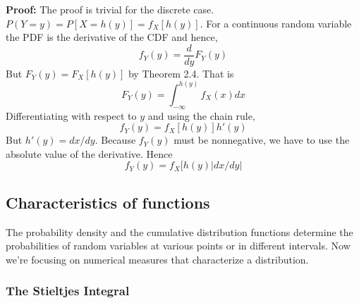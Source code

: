 \documentclass{article}
\begin{document}
\textbf{Proof:} The proof is trivial for the discrete case. \(P(Y=y) = P[X=h(y)] = f_X[h(y)]\). For a continuous random variable the PDF is the derivative of the CDF and hence,
\begin{equation*}
    f_Y(y)= \frac{d}{dy} F_Y(y)
\end{equation*}
But \(F_Y(y) = F_X[h(y)]\) by Theorem 2.4. That is
\begin{equation*}
    F_Y(y)= \int_{- \infty}^{h(y)} f_X(x) dx
\end{equation*}
Differentiating with respect to \(y\) and using the chain rule,
\begin{equation*}
    f_Y(y)=f_X[h(y)] h'(y)
\end{equation*}
But \(h'(y)=dx/dy\). Because \(f_Y(y)\) must be nonnegative, we have to use the absolute value of the derivative. Hence
\begin{equation*}
    f_Y(y)=f_X[h(y) \left|dx/dy\right|
\end{equation*}


\subsection{Characteristics of functions}

The probability density and the cumulative distribution functions determine the probabilities of random variables at various points or in different intervals. Now we're focusing on numerical measures that characterize a distribution.

\subsubsection{The Stieltjes Integral}
\end{document}
